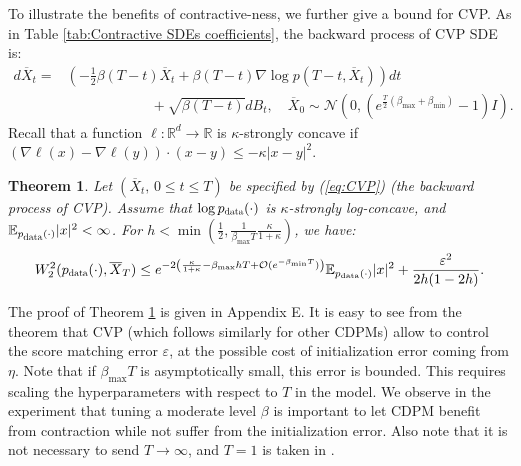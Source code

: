 \documentclass[letterpaper,10pt,reqno]{amsart}
\def\eqref#1{(\ref{#1})}
\newtheorem{theorem}{Theorem}
\numberwithin{equation}{section}
\begin{document}
\quad To illustrate the benefits of contractive-ness, we further give a bound for CVP. As in Table \ref{tab:Contractive SDEs coefficients}, the backward process of CVP SDE is:
\begin{equation}
\label{eq:CVP}
\begin{aligned}
d \overline{X}_t  = & \left(-\frac{1}{2} \beta(T-t) \overline{X}_t  +\beta(T-t) \nabla \log p(T-t, \overline{X}_t)\right)  dt \\
& \qquad \qquad \qquad+ \sqrt{\beta(T-t)} dB_t, \quad 
\overline{X}_0 \sim \mathcal{N}\left( 0, 
(e^{\frac{T}{2} (\beta_{\max} + \beta_{\min})}-1 ) I \right).
\end{aligned}
\end{equation}
Recall that a function $\ell: \mathbb{R}^d \to \mathbb{R}$ is $\kappa$-strongly concave if $(\nabla \ell(x) - \nabla \ell(y)) \cdot (x - y) \le - \kappa|x-y|^2$.
\begin{theorem}
\label{thm:CVPW2}
Let $(\overline{X}_t, \, 0 \le t \le T)$ be specified by \eqref{eq:CVP} (the backward process of CVP).
Assume that 
$\log p_{\scalebox{0.7}{data}}(\cdot)$ is $\kappa$-strongly log-concave,
and $\mathbb{E}_{p_{\scalebox{0.7}{data}}(\cdot)}|x|^2 < \infty$.
For $h<\min(\frac{1}{2},\frac{1}{\beta_{\text{max}}T}\frac{\kappa}{1+\kappa})$, we have:
\begin{equation}
\label{eq:sensitivity3}
W^2_2(p_{\scalebox{0.7}{data}}(\cdot), \overline{X}_T) \le 
e^{-2\left(\frac{\kappa}{1+\kappa} - \beta_{\max} hT + \mathcal{O}(e^{-\beta_{\min} T})  \right)}\mathbb{E}_{p_{\tiny \mbox{data}}(\cdot)}|x|^2 + \frac{\varepsilon^2}{2h (1-2h)}.
\end{equation}
\end{theorem}

\quad The proof of Theorem \ref{thm:CVPW2} is given in Appendix E.
It is easy to see from the theorem that CVP (which follows similarly for other CDPMs) 
allow to control the score matching error $\varepsilon$,
at the possible cost of initialization error coming from $\eta$.
Note that if $\beta_{\max} T$ is asymptotically small, 
this error is bounded.
This requires scaling the hyperparameters with respect to $T$ in the model.
We observe in the experiment that tuning a moderate level $\beta$ is important to let CDPM benefit from contraction while not suffer from the initialization error.
Also note that it is not necessary to send $T \to \infty$, and 
$T = 1$ is taken in \cite{Song20}.
\end{document}

